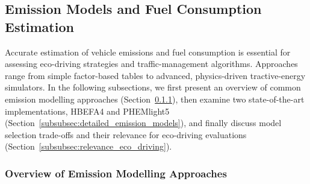 
\subsection{Emission Models and Fuel Consumption Estimation}
\label{subsec:emission_models_fuel_estimation}

Accurate estimation of vehicle emissions and fuel consumption is essential for assessing eco-driving strategies and traffic-management algorithms. Approaches range from simple factor-based tables to advanced, physics-driven tractive-energy simulators. In the following subsections, we first present an overview of common emission modelling approaches (Section~\ref{subsubsec:overview_emission_models}), then examine two state-of-the-art implementations, HBEFA4 and PHEMlight5 (Section~\ref{subsubsec:detailed_emission_models}), and finally discuss model selection trade-offs and their relevance for eco-driving evaluations (Section~\ref{subsubsec:relevance_eco_driving}). 

\subsubsection{Overview of Emission Modelling Approaches}
\label{subsubsec:overview_emission_models}

